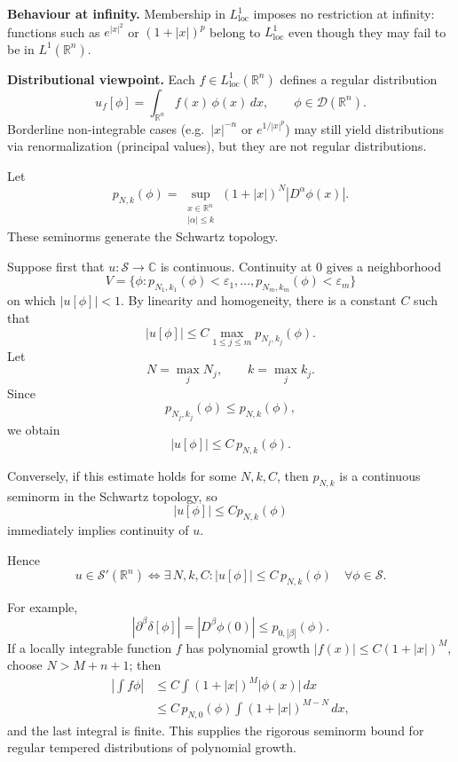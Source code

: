 \begin{problem}[CP-III-0024]
\bigskip

\par\smallskip\noindent\textbf{Behaviour at infinity.}\quad
Membership in $L^1_{\mathrm{loc}}$ imposes no restriction at infinity: functions such as $e^{|x|^2}$ or $(1+|x|)^p$ belong to $L^1_{\mathrm{loc}}$ even though they may fail to be in $L^1(\mathbb R^n)$.

\bigskip

\par\smallskip\noindent\textbf{Distributional viewpoint.}\quad
Each $f\in L^1_{\mathrm{loc}}(\mathbb R^n)$ defines a regular distribution
\[
u_f[\phi]=\int_{\mathbb R^n} f(x)\,\phi(x)\,dx,\qquad \phi\in\mathcal D(\mathbb R^n).
\]
Borderline non-integrable cases (e.g.\ $|x|^{-n}$ or $e^{1/|x|^p}$) may still yield distributions via renormalization (principal values), but they are not regular distributions.
\end{problem}

\begin{solution}
Let
\[
p_{N,k}(\phi)
=
\sup_{\substack{x\in\mathbb R^n\\|\alpha|\le k}}
(1+|x|)^N|D^\alpha\phi(x)|.
\]
These seminorms generate the Schwartz topology.

Suppose first that \(u:\mathcal S\to\mathbb C\) is continuous.  Continuity
at \(0\) gives a neighborhood
\[
V=
\{\phi:p_{N_1,k_1}(\phi)<\varepsilon_1,\ldots,
p_{N_m,k_m}(\phi)<\varepsilon_m\}
\]
on which \(|u[\phi]|<1\).  By linearity and homogeneity, there is a
constant \(C\) such that
\[
|u[\phi]|
\le
C\max_{1\le j\le m}p_{N_j,k_j}(\phi).
\]
Let
\[
N=\max_jN_j,
\qquad
k=\max_jk_j.
\]
Since
\[
p_{N_j,k_j}(\phi)\le p_{N,k}(\phi),
\]
we obtain
\[
\boxed{
|u[\phi]|
\le
C\,p_{N,k}(\phi).
}
\]

Conversely, if this estimate holds for some \(N,k,C\), then
\(p_{N,k}\) is a continuous seminorm in the Schwartz topology, so
\[
|u[\phi]|\le C p_{N,k}(\phi)
\]
immediately implies continuity of \(u\).

Hence
\[
\boxed{
u\in\mathcal S'(\mathbb R^n)
\iff
\exists\,N,k,C:
|u[\phi]|
\le
C\,p_{N,k}(\phi)
\quad\forall\phi\in\mathcal S.
}
\]

For example,
\[
|\partial^\beta\delta[\phi]|
=
|D^\beta\phi(0)|
\le
p_{0,|\beta|}(\phi).
\]
If a locally integrable function \(f\) has polynomial growth
\(|f(x)|\le C(1+|x|)^M\), choose \(N>M+n+1\); then
\[
\begin{aligned}
\left|\int f\phi\right|
&\le
C\int(1+|x|)^M|\phi(x)|\,dx\\
&\le
C\,p_{N,0}(\phi)
\int(1+|x|)^{M-N}\,dx,
\end{aligned}
\]
and the last integral is finite.  This supplies the rigorous seminorm
bound for regular tempered distributions of polynomial growth.
\end{solution}



